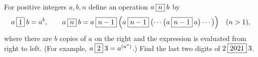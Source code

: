 For positive integers $a,b,n$ define an operation $a\mathbin{\fbox{$n$}}b$ by
\[a\mathbin{\fbox{$1$}}b=a^b,\qquad a\mathbin{\fbox{$n$}}b=a\mathbin{\fbox{$n-1$}}\Bigl(a\mathbin{\fbox{$n-1$}}\bigl(\cdots\bigl(a\mathbin{\fbox{$n-1$}}a\bigr)\cdots\bigr)\Bigr)\quad(n>1),\]
where there are $b$ copies of $a$ on the right and the expression is evaluated from right to left. (For example, $a\mathbin{\fbox{$2$}}3=a^{\left(a^a\right)}$.) Find the last two digits of $2\mathbin{\fbox{$2021$}}3$.
